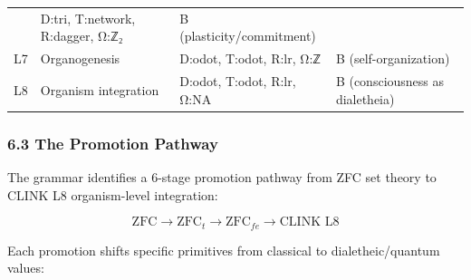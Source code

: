 \begin{longtable}[]{@{}llll@{}}
\begin{minipage}[t]{0.23\columnwidth}
\end{minipage} & \begin{minipage}[t]{0.27\columnwidth}\raggedright
D:tri, T:network, R:dagger, Ω:ℤ₂\strut
\end{minipage} & \begin{minipage}[t]{0.25\columnwidth}\raggedright
B (plasticity/commitment)\strut
\end{minipage}\tabularnewline
\begin{minipage}[t]{0.13\columnwidth}\raggedright
L7\strut
\end{minipage} & \begin{minipage}[t]{0.23\columnwidth}\raggedright
Organogenesis\strut
\end{minipage} & \begin{minipage}[t]{0.27\columnwidth}\raggedright
D:odot, T:odot, R:lr, Ω:ℤ\strut
\end{minipage} & \begin{minipage}[t]{0.25\columnwidth}\raggedright
B (self-organization)\strut
\end{minipage}\tabularnewline
\begin{minipage}[t]{0.13\columnwidth}\raggedright
L8\strut
\end{minipage} & \begin{minipage}[t]{0.23\columnwidth}\raggedright
Organism integration\strut
\end{minipage} & \begin{minipage}[t]{0.27\columnwidth}\raggedright
D:odot, T:odot, R:lr, Ω:NA\strut
\end{minipage} & \begin{minipage}[t]{0.25\columnwidth}\raggedright
B (consciousness as dialetheia)\strut
\end{minipage}\tabularnewline
\bottomrule
\end{longtable}

\hypertarget{the-promotion-pathway}{%
\subsubsection{6.3 The Promotion Pathway}\label{the-promotion-pathway}}

The grammar identifies a 6-stage promotion pathway from ZFC set theory
to CLINK L8 organism-level integration:

\[\text{ZFC} \longrightarrow \text{ZFC}_t \longrightarrow \text{ZFC}_{fe} \longrightarrow \text{CLINK L8}\]

Each promotion shifts specific primitives from classical to
dialetheic/quantum values:

